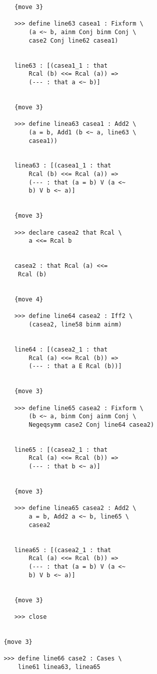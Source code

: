 \documentclass[12pt]{article}
\begin{document}
\begin{verbatim}
            {move 3}

            >>> define line63 casea1 : Fixform \
                (a <~ b, ainm Conj binm Conj \
                case2 Conj line62 casea1)


            line63 : [(casea1_1 : that 
                Rcal (b) <<= Rcal (a)) => 
                (--- : that a <~ b)]


            {move 3}

            >>> define linea63 casea1 : Add2 \
                (a = b, Add1 (b <~ a, line63 \
                casea1))


            linea63 : [(casea1_1 : that 
                Rcal (b) <<= Rcal (a)) => 
                (--- : that (a = b) V (a <~ 
                b) V b <~ a)]


            {move 3}

            >>> declare casea2 that Rcal \
                a <<= Rcal b


            casea2 : that Rcal (a) <<= 
             Rcal (b)


            {move 4}

            >>> define line64 casea2 : Iff2 \
                (casea2, line58 binm ainm)


            line64 : [(casea2_1 : that 
                Rcal (a) <<= Rcal (b)) => 
                (--- : that a E Rcal (b))]


            {move 3}

            >>> define line65 casea2 : Fixform \
                (b <~ a, binm Conj ainm Conj \
                Negeqsymm case2 Conj line64 casea2)


            line65 : [(casea2_1 : that 
                Rcal (a) <<= Rcal (b)) => 
                (--- : that b <~ a)]


            {move 3}

            >>> define linea65 casea2 : Add2 \
                a = b, Add2 a <~ b, line65 \
                casea2


            linea65 : [(casea2_1 : that 
                Rcal (a) <<= Rcal (b)) => 
                (--- : that (a = b) V (a <~ 
                b) V b <~ a)]


            {move 3}

            >>> close


         {move 3}

         >>> define line66 case2 : Cases \
             line61 linea63, linea65



\end{verbatim}
\end{document}
